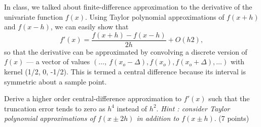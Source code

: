 \begin{problem}
  In class, we talked about finite-difference approximation
  to the derivative of the univariate function $f(x)$.
  Using Taylor polynomial approximations of $f(x + h)$ and $f(x - h)$,
  we can easily show that \[ f'(x) = \frac{f(x + h) - f(x - h)}{2h} + O(h2), \]
  so that the derivative can be approximated by convolving
  a discrete version of $f(x)$ --- a vector of values
  $(\ldots,\ f(x_{o} - \Delta), f(x_{o}), f(x_{o}+ \Delta), \ldots)$
  with kernel (1/2, 0, -1/2).
  This is termed a central difference because its interval is symmetric about a sample point.

  \begin{enumroman}
    \item Derive a higher order central-difference approximation
      to $f'(x)$ such that the truncation error tends to zero
      as $h^4$ instead of $h^2$.
      \emph{Hint : consider Taylor polynomial approximations of $f(x \pm 2h)$
        in addition to $f(x \pm h)$}. (7 points)


\end{enumroman}
\end{problem}
